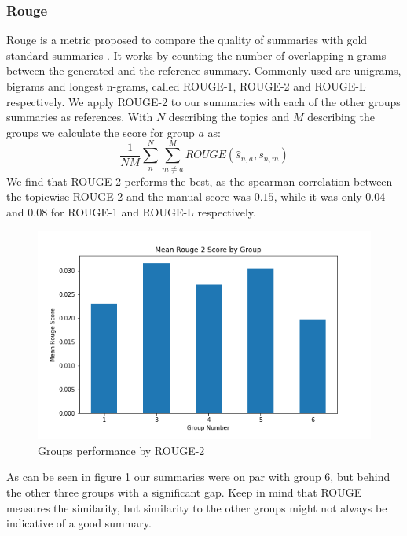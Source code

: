 \subsubsection{Rouge}
Rouge is a metric proposed to compare the quality of summaries with gold standard summaries \cite{lin2004rouge}. It works by counting the number of overlapping n-grams between the generated and the reference summary. Commonly used are unigrams, bigrams and longest n-grams, called ROUGE-1, ROUGE-2 and ROUGE-L respectively. We apply ROUGE-2 to our summaries with each of the other groups summaries as references. With $N$ describing the topics and $M$ describing the groups we calculate the score for group $a$ as:
$$\frac{1}{NM} \sum^N_{n} \sum^M_{m\neq a} ROUGE(\hat{s}_{n,a}, s_{n,m}) $$
We find that ROUGE-2 performs the best, as the spearman correlation between the topicwise ROUGE-2 and the manual score was $0.15$, while it was only $0.04$ and $0.08$ for ROUGE-1 and ROUGE-L respectively.

\begin{figure}[!ht]
	\centering
	\includegraphics[width=0.55\linewidth]{../evaluation/meanrouge.png}
	\caption{Groups performance by ROUGE-2}
	\label{fig:rouge}
\end{figure}

As can be seen in figure \ref{fig:rouge} our summaries were on par with group 6, but behind the other three groups with a significant gap. Keep in mind that ROUGE measures the similarity, but similarity to the other groups might not always be indicative of a good summary. 